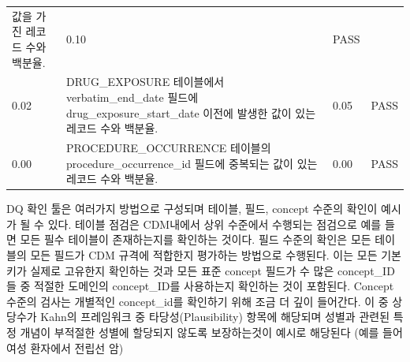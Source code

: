 \documentclass[10.5pt]{book}
\theoremstyle{definition}
\theoremstyle{definition}
\theoremstyle{definition}
\theoremstyle{remark}
\begin{document}
\begin{longtable}[]{@{}llll@{}}
\begin{minipage}[t]{0.47\columnwidth}
값을 가진 레코드 수와 백분율.\strut
\end{minipage} & \begin{minipage}[t]{0.10\columnwidth}\raggedright\strut
0.10\strut
\end{minipage} & \begin{minipage}[t]{0.07\columnwidth}\raggedright\strut
PASS\strut
\end{minipage}\tabularnewline
\begin{minipage}[t]{0.12\columnwidth}\raggedright\strut
0.02\strut
\end{minipage} & \begin{minipage}[t]{0.47\columnwidth}\raggedright\strut
DRUG\_EXPOSURE 테이블에서 verbatim\_end\_date 필드에
drug\_exposure\_start\_date 이전에 발생한 값이 있는 레코드 수와
백분율.\strut
\end{minipage} & \begin{minipage}[t]{0.10\columnwidth}\raggedright\strut
0.05\strut
\end{minipage} & \begin{minipage}[t]{0.07\columnwidth}\raggedright\strut
PASS\strut
\end{minipage}\tabularnewline
\begin{minipage}[t]{0.12\columnwidth}\raggedright\strut
0.00\strut
\end{minipage} & \begin{minipage}[t]{0.47\columnwidth}\raggedright\strut
PROCEDURE\_OCCURRENCE 테이블의 procedure\_occurrence\_id 필드에 중복되는
값이 있는 레코드 수와 백분율.\strut
\end{minipage} & \begin{minipage}[t]{0.10\columnwidth}\raggedright\strut
0.00\strut
\end{minipage} & \begin{minipage}[t]{0.07\columnwidth}\raggedright\strut
PASS\strut
\end{minipage}\tabularnewline
\bottomrule
\end{longtable}

DQ 확인 툴은 여러가지 방법으로 구성되며 테이블, 필드, concept 수준의
확인이 예시가 될 수 있다. 테이블 점검은 CDM내에서 상위 수준에서 수행되는
점검으로 예를 들면 모든 필수 테이블이 존재하는지를 확인하는 것이다. 필드
수준의 확인은 모든 테이블의 모든 필드가 CDM 규격에 적합한지 평가하는
방법으로 수행된다. 이는 모든 기본 키가 실제로 고유한지 확인하는 것과
모든 표준 concept 필드가 수 많은 concept\_ID들 중 적절한 도메인의
concept\_ID를 사용하는지 확인하는 것이 포함된다. Concept 수준의 검사는
개별적인 concept\_id를 확인하기 위해 조금 더 깊이 들어간다. 이 중
상당수가 Kahn의 프레임워크 중 타당성(Plausibility) 항목에 해당되며
성별과 관련된 특정 개념이 부적절한 성별에 할당되지 않도록 보장하는것이
예시로 해당된다 (예를 들어 여성 환자에서 전립선 암)
\end{document}
